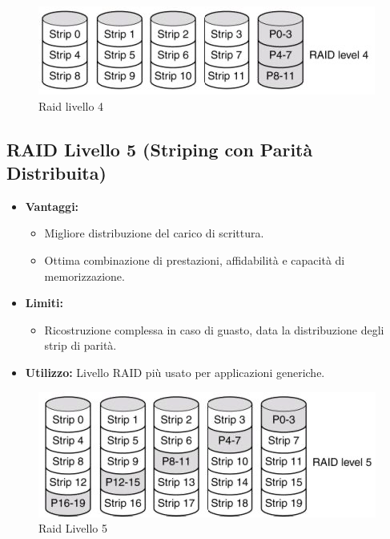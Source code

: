 \begin{figure}[h] \centering \includegraphics[width=0.50\linewidth]{images/raid_level4.png} \caption{Raid livello 4} \end{figure}

\subsection{RAID Livello 5 (Striping con Parità Distribuita)}


\begin{itemize}
    \item \textbf{Vantaggi:}
    \begin{itemize}
        \item Migliore distribuzione del carico di scrittura.
        \item Ottima combinazione di prestazioni, affidabilità e capacità di memorizzazione.
    \end{itemize}
    \item \textbf{Limiti:}
    \begin{itemize}
        \item Ricostruzione complessa in caso di guasto, data la distribuzione degli strip di parità.
    \end{itemize}
    \item \textbf{Utilizzo:} Livello RAID più usato per applicazioni generiche.
\end{itemize}

\begin{figure}[h] \centering \includegraphics[width=0.50\linewidth]{images/raid_level5.png} \caption{Raid Livello 5} \end{figure}

